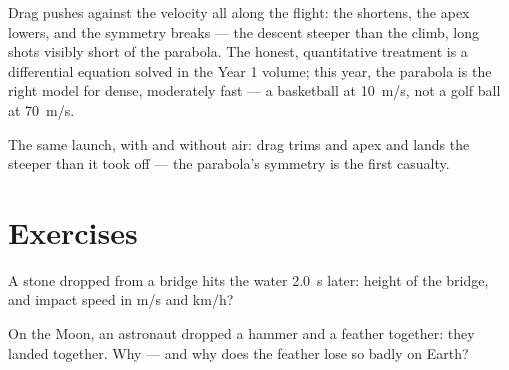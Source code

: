 \begin{remark}\label{rem:g12:projectile-motion:drag}
Drag pushes against the velocity all along the flight: the  shortens,
the apex lowers, and the symmetry breaks --- the descent steeper than the
climb, long shots visibly short of the parabola. The honest, quantitative
treatment is a differential equation solved in the Year 1 volume; this
year, the parabola is the right model for dense, moderately fast
 --- a basketball at \qty{10}{m/s}, not a golf ball at
\qty{70}{m/s}.
\end{remark}

\begin{omfigure}

{\small The same launch, with and without air: drag trims  and apex
and lands the  steeper than it took off --- the parabola's
symmetry is the first casualty.}
\end{omfigure}

\section{Exercises}

\begin{exercise}[$\star$]\label{exo:g12:projectile-motion:1}
A stone dropped from a bridge hits the water \qty{2.0}{s} later: height of
the bridge, and impact speed in \unit{m/s} and \unit{km/h}?
\end{exercise}

\begin{exercise}[$\star$]\label{exo:g12:projectile-motion:2}
On the Moon, an astronaut dropped a hammer and a feather together: they
landed together. Why --- and why does the feather lose so badly on Earth?
\end{exercise}

